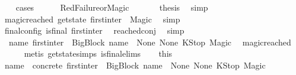 \begin{isabellebody}
\ \ \isamarkupfalse%
\ cases\isanewline
\ \ \ \ \isamarkupfalse%
\ RedFailure{\isacharunderscore}{\kern0pt}or{\isacharunderscore}{\kern0pt}Magic\ \isanewline
\ \ \ \ \isamarkupfalse%
\ {\isacharquery}{\kern0pt}thesis\ \isamarkupfalse%
\ simp\isanewline
\ \ \isamarkupfalse%
\isanewline
\ \ \isamarkupfalse%
\ magic{\isacharunderscore}{\kern0pt}reached{\isacharcolon}{\kern0pt}\ {\isachardoublequoteopen}{\isacharparenleft}{\kern0pt}get{\isacharunderscore}{\kern0pt}state\ first{\isacharunderscore}{\kern0pt}inter{\isacharparenright}{\kern0pt}\ {\isacharequal}{\kern0pt}\ Magic{\isachardoublequoteclose}\ \isamarkupfalse%
\ simp\isanewline
\ \ \isamarkupfalse%
\ final{\isacharunderscore}{\kern0pt}config{\isacharcolon}{\kern0pt}\ {\isachardoublequoteopen}is{\isacharunderscore}{\kern0pt}final\ first{\isacharunderscore}{\kern0pt}inter{\isachardoublequoteclose}\ \isamarkupfalse%
\ reached{\isacharunderscore}{\kern0pt}conj\ \isamarkupfalse%
\ simp\isanewline
\ \ \isamarkupfalse%
\ {\isachardoublequoteopen}{\isasymexists}\ name{\isachardot}{\kern0pt}\ first{\isacharunderscore}{\kern0pt}inter\ {\isacharequal}{\kern0pt}\ {\isacharparenleft}{\kern0pt}{\isacharparenleft}{\kern0pt}BigBlock\ name\ {\isacharbrackleft}{\kern0pt}{\isacharbrackright}{\kern0pt}\ None\ None{\isacharparenright}{\kern0pt}{\isacharcomma}{\kern0pt}\ KStop{\isacharcomma}{\kern0pt}\ Magic{\isacharparenright}{\kern0pt}{\isachardoublequoteclose}\ \isamarkupfalse%
\ magic{\isacharunderscore}{\kern0pt}reached\isanewline
\ \ \ \ \isamarkupfalse%
\ {\isacharparenleft}{\kern0pt}metis\ get{\isacharunderscore}{\kern0pt}state{\isachardot}{\kern0pt}simps\ is{\isacharunderscore}{\kern0pt}final{\isachardot}{\kern0pt}elims{\isacharparenleft}{\kern0pt}{}{\isacharparenright}{\kern0pt}{\isacharparenright}{\kern0pt}\isanewline
\ \ \isamarkupfalse%
\ this\ \isamarkupfalse%
\ name{}\ \ concrete{\isacharcolon}{\kern0pt}\ {\isachardoublequoteopen}first{\isacharunderscore}{\kern0pt}inter\ {\isacharequal}{\kern0pt}\ {\isacharparenleft}{\kern0pt}{\isacharparenleft}{\kern0pt}BigBlock\ name{}\ {\isacharbrackleft}{\kern0pt}{\isacharbrackright}{\kern0pt}\ None\ None{\isacharparenright}{\kern0pt}{\isacharcomma}{\kern0pt}\ KStop{\isacharcomma}{\kern0pt}\ Magic{\isacharparenright}{\kern0pt}{\isachardoublequoteclose}\ \isanewline

\end{isabellebody}
